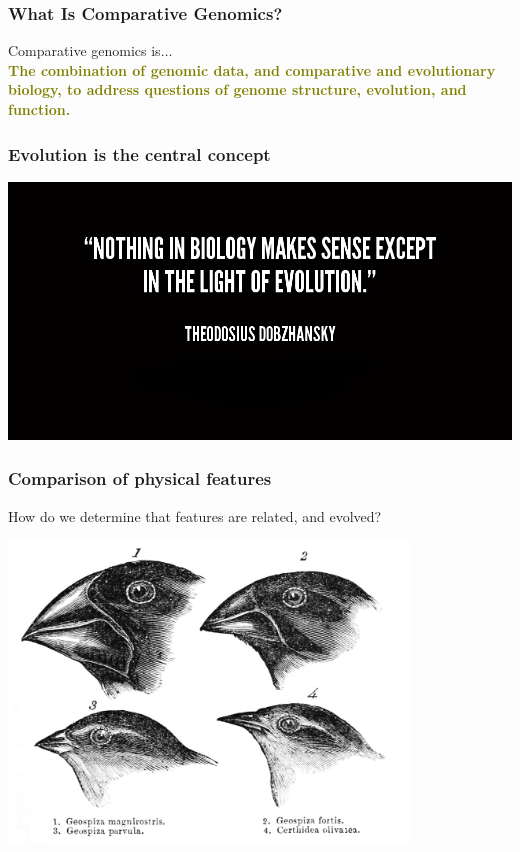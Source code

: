 




%
\begin{frame}
  \frametitle{What Is Comparative Genomics?}
  Comparative genomics is$\ldots$ \\
  \Large{
    \textcolor{olive}{
      \textbf{
      The combination of genomic data, and comparative and evolutionary biology, to address questions of   genome structure, evolution, and function.
      }
    }
  }
\end{frame}

%
\begin{frame}
  \frametitle{Evolution is the central concept}
  \begin{center}
    \includegraphics[width=\textwidth]{images/dobzhansky_quote}
  \end{center}  
\end{frame}

%
\begin{frame}
  \frametitle{Comparison of physical features}
  How do we determine that features are related, and evolved? \\
  \begin{center}
    \includegraphics[width=0.8\textwidth]{images/darwin_finches}
  \end{center}  
\end{frame}

